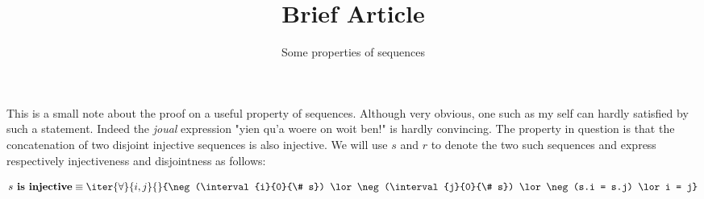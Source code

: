 \documentclass[10pt]{report}
\title{Brief Article}
\author{Some properties of sequences}
\begin{document}
\maketitle

This is a small note about the proof on a useful property of sequences.  Although very obvious, one such as my self can hardly satisfied by such a statement.  Indeed the \emph{joual} expression "yien qu'a woere on woit ben!" is hardly convincing.  The property in question is that the concatenation of two disjoint injective sequences is also injective.  We will use $s$ and $r$ to denote the two such sequences and express respectively injectiveness and disjointness as follows:

\begin{equation}
	s \textbf{ is injective} \equiv \iter{\forall}{i,j}{}{\neg (\interval{i}{0}{\# s}) \lor \neg (\interval {j}{0}{\# s}) \lor \neg (s.i = s.j) \lor i = j}
\end{equation}

\END
\end{document}
